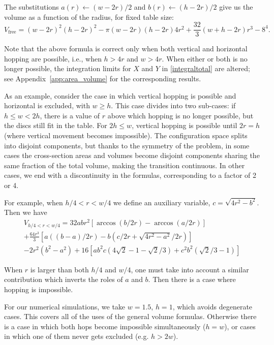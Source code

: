 \documentclass[superscriptaddress,pre,reprint,showpacs,twocolumn]{revtex4-1}
\begin{document}
The substitutions $a(r)\leftarrow (w-2r)/2$ and $b(r)\leftarrow (h-2r)/2$ give us
 the volume as a function of the radius, for fixed table size:
\begin{equation}\label{volumewhd}
 V_\text{free} 
= (w-2r)^{2} (h-2r)^{2}  - 
 \pi (w-2r)(h-2r) 4 r^{2} + 
\textstyle \frac{32}{3} (w+h-2r) r^{3}  
- 8^{4}.
\end{equation}

Note that the above formula is correct only when both
vertical and horizontal hopping are possible, i.e., when $h > 4r$ and $w > 4r$.
When either or both is no longer possible, the 
integration limits for $X$ and $Y$ in \eqref{integraltotal} are altered; 
see Appendix~\ref{app:area_volume} for the corresponding results.

As an example, consider the case  in which vertical hopping is possible
and horizontal is excluded, with  $w \geq h$.
This case divides into two sub-cases: if
$ h \leq  w < 2 h $, there is a value of $r$ above which hopping is no longer possible,
but the discs still fit in the table. For $2 h \leq w $, vertical hopping is
possible until $ 2 r= h$ (where vertical movement becomes impossible). 
The configuration space splits into disjoint components, but 
thanks to the symmetry of
the problem, in some cases the cross-section areas and 
volumes become disjoint components sharing the same fraction of
the total volume, making the transition continuous. In other cases, we end with 
a discontinuity in the formulas,
corresponding to a factor of 2 or 4. 


For example, when $h/4 < r < w/4$ 
we define an auxiliary variable,
$c = \sqrt{4r^2-b^2}$. Then we have
\begin{multline}\label{VolumenCasoFeo}
V_{h/4<r<w/4} = 32abr^2 \left[ \arccos(b/2r)-\arccos(a/2r) \right]\\
+\frac{64 r^3}{3 } \left[ a((b-a)/2r)-b(c/2r+\sqrt{4r^2-a^2}/2r) \right]\\
-2r^2 (b^2-a^2)
+16 \left[ a b^2 c (4\sqrt{2}-1-\sqrt{2}/3)
+c^2b^2 (\sqrt{2}/3-1) \right]
\end{multline}

When $r$ is larger than both $h/4$ and $w/4$, one must take
into account a similar
contribution which inverts the roles of $a$ and $b$. Then there is
a case where hopping is impossible. 

For our numerical simulations, we take $w=1.5$, $h=1$, which avoids degenerate cases. 
This covers all of the uses of the general volume formulas.
Otherwise there is a case in which both hops become impossible simultaneously
($h=w$), or cases in which one of them never gets excluded (e.g. $h>2w$).
\end{document}
